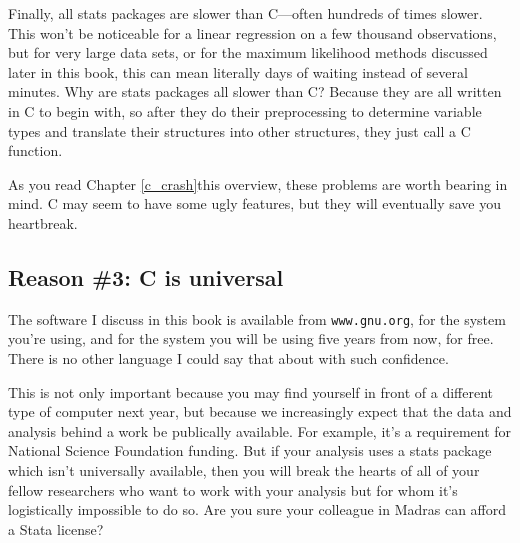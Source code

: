 Finally, all stats packages are slower than C---often hundreds of times
slower. This won't be noticeable for a linear regression on a few thousand
observations, but for very large data sets, or for the maximum likelihood
methods discussed later in this book, this can mean literally days of
waiting instead of several minutes.  Why are stats packages all slower
than C? Because they are all written in C to begin with, so after they
do their preprocessing to determine variable types and translate their
structures into other structures, they just call a C function.

As you read \ifbook Chapter \ref{c_crash}\else this overview\fi, these
problems are worth bearing in mind. C may seem to have some ugly
features, but they will eventually save you heartbreak.

\subsection{Reason \#3: C is universal} 
The software I discuss in this book is available from {\tt www.gnu.org}, for the
system you're using, and for the system you will be using five years from now, for
free. There is no other language I could say that about with such confidence.

This is not only important because you may find yourself in front of
a different type of computer next year, but because we increasingly
expect that the data and analysis behind a work be publically available.
For example, it's a requirement for National Science Foundation funding. But if your analysis uses
a stats package which isn't universally available, then you will break
the hearts of all of your fellow researchers who want to work with your analysis
but for whom it's logistically impossible to do so. Are you sure your
colleague in Madras can afford a Stata license?

